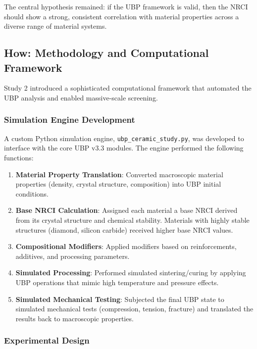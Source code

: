 \documentclass[11pt,a4paper]{article}
\begin{document}
The central hypothesis remained: if the UBP framework is valid, then the NRCI should show a strong, consistent correlation with material properties across a diverse range of material systems.

\subsection{How: Methodology and Computational Framework}

Study 2 introduced a sophisticated computational framework that automated the UBP analysis and enabled massive-scale screening.

\subsubsection{Simulation Engine Development}

A custom Python simulation engine, \texttt{ubp\_ceramic\_study.py}, was developed to interface with the core UBP v3.3 modules. The engine performed the following functions:

\begin{enumerate}
    \item \textbf{Material Property Translation}: Converted macroscopic material properties (density, crystal structure, composition) into UBP initial conditions.
    
    \item \textbf{Base NRCI Calculation}: Assigned each material a base NRCI derived from its crystal structure and chemical stability. Materials with highly stable structures (diamond, silicon carbide) received higher base NRCI values.
    
    \item \textbf{Compositional Modifiers}: Applied modifiers based on reinforcements, additives, and processing parameters.
    
    \item \textbf{Simulated Processing}: Performed simulated sintering/curing by applying UBP operations that mimic high temperature and pressure effects.
    
    \item \textbf{Simulated Mechanical Testing}: Subjected the final UBP state to simulated mechanical tests (compression, tension, fracture) and translated the results back to macroscopic properties.
\end{enumerate}

\subsubsection{Experimental Design}
\end{document}
